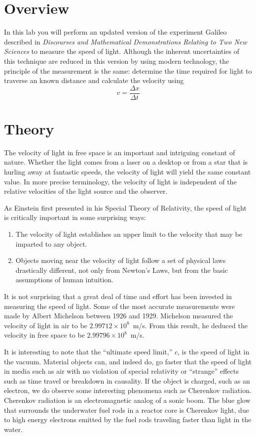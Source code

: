 \section{Overview}

In this lab you will perform an updated version of the experiment Galileo
described in {\em Discourses and Mathematical Demonstrations Relating to Two New
  Sciences} to measure the speed of light.  Although the inherent uncertainties
of this technique are reduced in this version by using modern technology, the
principle of the measurement is the same: determine the time required for light
to traverse an known distance and calculate the velocity using
\[
v=\frac{\Delta x}{\Delta t}
\]


\section{Theory}

The velocity of light in free space is an important and intriguing 
constant of nature. Whether the light comes from a laser on a desktop 
or from a star that is hurling away at fantastic speeds, the velocity of 
light will yield the same constant value. In more precise terminology, 
the velocity of light is independent of the relative velocities of the light 
source and the observer. 

As Einstein first presented in his Special Theory of Relativity, the 
speed of light is critically important in some surprising ways: 
\begin{enumerate}
\item The velocity of light establishes an upper limit to the velocity that 
may be imparted to any object.
\item Objects moving near the velocity of light follow a set of physical 
laws drastically different, not only from Newton's Laws, but from 
the basic assumptions of human intuition.
\end{enumerate}

It is not surprising that a great deal of time and effort has been invested 
in measuring the speed of light. Some of the most accurate 
measurements were made by Albert Michelson between 1926 and 
1929. Michelson measured the velocity of light in air to be $2.99712\times10^8$~m/s. From this result, he deduced the velocity in free space to be $2.99796 \times 10^8$~m/s.

It is interesting to note that the ``ultimate speed limit,'' $c$, is the speed of light in the vacuum.  Material objects can, and indeed do, go faster that the speed of light in media such as air with no violation of special relativity or ``strange'' effects such as time travel or breakdown in causality.  If the object is charged, such as an electron, we do observe some interesting phenomena such as Cherenkov radiation.
 Cherenkov radiation is an electromagnetic analog of a sonic boom.  The blue glow that surrounds the underwater fuel rods in a reactor core is Cherenkov light, due to high energy electrons emitted by the fuel rods traveling faster than light in the water.

